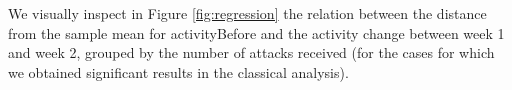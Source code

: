 \documentclass[10pt,]{scrartcl}
\newenvironment{Shaded}{\begin{snugshade}}{\end{snugshade}}
\newcommand{\KeywordTok}[1]{\textcolor[rgb]{0.13,0.29,0.53}{\textbf{#1}}}
\newcommand{\DecValTok}[1]{\textcolor[rgb]{0.00,0.00,0.81}{#1}}
\newcommand{\StringTok}[1]{\textcolor[rgb]{0.31,0.60,0.02}{#1}}
\newcommand{\ControlFlowTok}[1]{\textcolor[rgb]{0.13,0.29,0.53}{\textbf{#1}}}
\newcommand{\OperatorTok}[1]{\textcolor[rgb]{0.81,0.36,0.00}{\textbf{#1}}}
\newcommand{\NormalTok}[1]{#1}
\begin{document}
We visually inspect in Figure \ref{fig:regression} the relation between
the distance from the sample mean for \textsf{activityBefore} and the
activity change between week 1 and week 2, grouped by the number of
attacks received (for the cases for which we obtained significant
results in the classical analysis).

\footnotesize

\begin{Shaded}
\end{Shaded}
\end{document}
